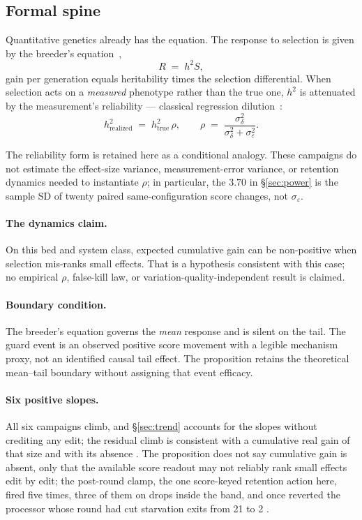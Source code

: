 \subsection*{Formal spine}

Quantitative genetics already has the equation. The response to selection
is given by the breeder's equation~\cite{falconer-mackay},
\[
  R \;=\; h^2 S ,
\]
gain per generation equals heritability times the selection differential.
When selection acts on a \emph{measured} phenotype rather than the true
one, $h^2$ is attenuated by the measurement's reliability --- classical
regression dilution~\cite{hutcheon-dilution}:
\[
  h^2_{\text{realized}} \;=\; h^2_{\text{true}}\,\rho ,
  \qquad
  \rho \;=\; \frac{\sigma^2_{\delta}}{\sigma^2_{\delta}+\sigma^2_{\varepsilon}} .
\]

The reliability form is retained here as a conditional analogy. These
campaigns do not estimate the effect-size variance, measurement-error
variance, or retention dynamics needed to instantiate $\rho$; in
particular, the $3.70$ in \S\ref{sec:power} is the sample SD of twenty
paired same-configuration score changes, not $\sigma_\varepsilon$.

\paragraph{The dynamics claim.} On this bed and system class, expected
cumulative gain can be non-positive when selection mis-ranks small
effects. That is a hypothesis consistent with this case; no empirical
$\rho$, false-kill law, or variation-quality-independent result is
claimed.

\paragraph{Boundary condition.} The breeder's equation governs the
\emph{mean} response and is silent on the tail. The guard event is an
observed positive score movement with a legible mechanism proxy, not an
identified causal tail effect. The proposition retains the theoretical
mean--tail boundary without assigning that event efficacy.

\paragraph{Six positive slopes.} All six campaigns climb, and
\S\ref{sec:trend} accounts for the slopes without crediting any edit; the
residual climb is consistent with a cumulative real gain of that size and
with its absence . The proposition does not say cumulative gain is
absent, only that the available score readout may not reliably rank small effects edit by edit; the
post-round clamp, the one score-keyed retention action here, fired five
times, three of them on drops inside the band, and once reverted the
processor whose round had cut starvation exits from 21 to 2 .

